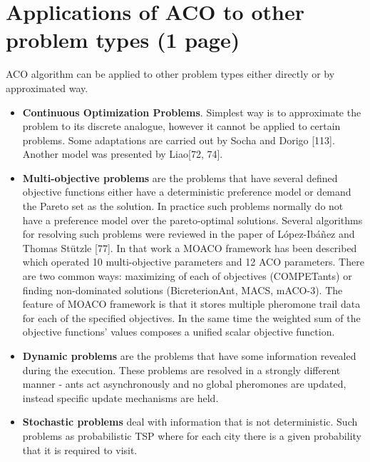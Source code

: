 \section{Applications of ACO to other problem types (1 page)}
ACO algorithm can be applied to other problem types either directly or by approximated way.

\begin{itemize}
\item \textbf{Continuous Optimization Problems}. Simplest way is to approximate the problem to its discrete analogue, however it cannot be applied to certain problems. Some adaptations are carried out by Socha and Dorigo [113]. Another model was presented by Liao[72, 74].

\item \textbf{Multi-objective problems} are the problems that have several defined objective functions either have a deterministic preference model or demand the Pareto set as the solution. In practice such problems normally do not have a preference model over the pareto-optimal solutions. Several algorithms for resolving such problems were reviewed in the paper of L{\'o}pez-Ib{\'a}{\~n}ez and Thomas St{\"u}tzle [77]. In that work a MOACO framework has been described which operated 10 multi-objective parameters and 12 ACO parameters. There are two common ways: maximizing of each of objectives (COMPETants) or finding non-dominated solutions (BicreterionAnt, MACS, mACO-3). The feature of MOACO framework is that it stores multiple pheromone trail data for each of the specified objectives. In the same time the weighted sum of the objective functions' values composes a unified scalar objective function.

\item \textbf{Dynamic problems} are the problems that have some information revealed during the execution. These problems are resolved in a strongly different manner - ants act asynchronously and no global pheromones are updated, instead specific update mechanisms are held.

\item \textbf{Stochastic problems} deal with information that is not deterministic. Such problems as probabilistic TSP where for each city there is a given probability that it is required to visit.
\end{itemize}